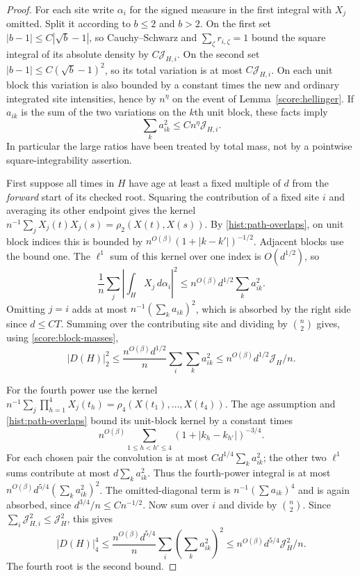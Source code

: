 \begin{proof}
For each site write $\alpha_i$ for the signed measure in the first integral
with $X_j$ omitted.  Split it according to $b\le2$ and $b>2$.  On the first
set $|b-1|\le C|\sqrt b-1|$, so Cauchy--Schwarz and $\sum_\zeta r_{i,\zeta}=1$
bound the square integral of its absolute density by $C\mathcal J_{H,i}$.
On the second set $|b-1|\le C(\sqrt b-1)^2$, so its total variation is at
most $C\mathcal J_{H,i}$.  On each unit block this variation is also bounded
by a constant times the new and ordinary integrated site intensities, hence
by $n^\eta$ on the event of Lemma~\ref{score:hellinger}.  If $a_{ik}$ is the sum
of the two variations on the $k$th unit block, these facts imply
\begin{equation}\label{score:block-masses}
 \sum_k a_{ik}^2\le Cn^\eta\mathcal J_{H,i}.
\end{equation}
In particular the large ratios have been treated by total mass, not by a
pointwise square-integrability assertion.

First suppose all times in $H$ have age at least a fixed multiple of $d$
from the \emph{forward} start of its checked root.  Squaring the contribution
of a fixed site $i$ and averaging its other endpoint gives the kernel
$n^{-1}\sum_jX_j(t)X_j(s)=\rho_2(X(t),X(s))$.  By
\eqref{hist:path-overlaps}, on unit block indices this is bounded by
$n^{O(\beta)}(1+|k-k'|)^{-1/2}$.  Adjacent blocks use the bound one.  The
$\ell^1$ sum of this kernel over one index is $O(d^{1/2})$, so
\[
 \frac1n\sum_j\left|\int_H X_j\,d\alpha_i\right|^2
   \le n^{O(\beta)}d^{1/2}\sum_k a_{ik}^2.
\]
Omitting $j=i$ adds at most $n^{-1}(\sum_k a_{ik})^2$, which is absorbed
by the right side since $d\le CT$.  Summing over the contributing site and
dividing by $\binom n2$ gives, using \eqref{score:block-masses},
\[
 |D(H)|_2^2\le \frac{n^{O(\beta)}d^{1/2}}n
                    \sum_i\sum_k a_{ik}^2
       \le n^{O(\beta)}d^{1/2}\mathcal J_H/n.
\]

For the fourth power use the kernel
$n^{-1}\sum_j\prod_{h=1}^4X_j(t_h)=\rho_4(X(t_1),\ldots,X(t_4))$.
The age assumption and \eqref{hist:path-overlaps} bound its unit-block
kernel by a constant times
\[
 n^{O(\beta)}\sum_{1\le h<h'\le4}(1+|k_h-k_{h'}|)^{-3/4}.
\]
For each chosen pair the convolution is at most
$Cd^{1/4}\sum_k a_{ik}^2$; the other two $\ell^1$ sums contribute at most
$d\sum_k a_{ik}^2$.  Thus the fourth-power integral is at most
$n^{O(\beta)}d^{5/4}(\sum_k a_{ik}^2)^2$.  The omitted-diagonal term is
$n^{-1}(\sum a_{ik})^4$ and is again absorbed, since $d^{3/4}/n\le Cn^{-1/2}$.
Now sum over $i$ and divide by $\binom n2$.  Since
$\sum_i\mathcal J_{H,i}^2\le\mathcal J_H^2$, this gives
\[
 |D(H)|_4^4\le\frac{n^{O(\beta)}d^{5/4}}n
                   \sum_i\left(\sum_k a_{ik}^2\right)^2
       \le n^{O(\beta)}d^{5/4}\mathcal J_H^2/n.
\]
The fourth root is the second bound.


\end{proof}
